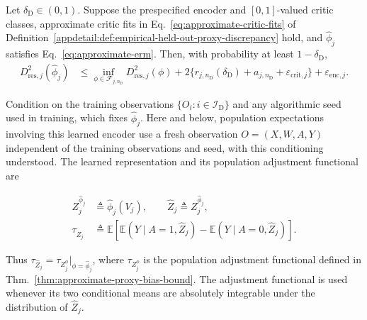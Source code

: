 \begin{proposition}
\label{appdetail:thm:representation-oracle}
\normalfont
 Let $\delta_{\mathrm D}\in(0,1)$. Suppose the prespecified encoder and $[0,1]$-valued critic classes, approximate critic fits in Eq.~\eqref{eq:approximate-critic-fits} of Definition~\ref{appdetail:def:empirical-held-out-proxy-discrepancy} hold, and $\widehat\phi_j$ satisfies Eq.~\eqref{eq:approximate-erm}. Then, with probability at least $1-\delta_{\mathrm D}$,
\begin{align}
D_{\mathrm{res},j}^2(\widehat\phi_j) &\le \inf_{\phi\in\mathcal F_{j,n_{\mathrm D}}}D_{\mathrm{res},j}^2(\phi) +2\{r_{j,n_{\mathrm D}}(\delta_{\mathrm D})+a_{j,n_{\mathrm D}}+\varepsilon_{\mathrm{crit},j}\} +\varepsilon_{\mathrm{enc},j}.
\label{eq:representation-oracle-discrepancy}
\end{align}
\end{proposition}

Condition on the training observations $\{O_i:i\in\mathcal I_{\mathrm D}\}$ and any algorithmic seed used in training, which fixes $\widehat\phi_j$. Here and below, population expectations involving this learned encoder use a fresh observation $O=(X,W,A,Y)$ independent of the training observations and seed, with this conditioning understood.
The learned representation and its population adjustment functional are

\begin{align}
Z_j^{\widehat\phi_j}
&\triangleq\widehat\phi_j(V_j),\qquad\widehat Z_j\triangleq Z_j^{\widehat\phi_j},\nonumber\\
\tau_{\widehat Z_j}
&\triangleq
\mathbb E\!\left[
\mathbb E(Y\mid A=1,\widehat Z_j)
-
\mathbb E(Y\mid A=0,\widehat Z_j)
\right].
\label{eq:learned-adjustment-functional}
\end{align}

Thus $\tau_{\widehat Z_j}=\tau_{Z_j^\phi}\big|_{\phi=\widehat\phi_j}$, where $\tau_{Z_j^\phi}$ is the population adjustment functional defined in Thm.~\ref{thm:approximate-proxy-bias-bound}.
The adjustment functional is used whenever its two conditional means are absolutely integrable under the distribution of $\widehat Z_j$.

